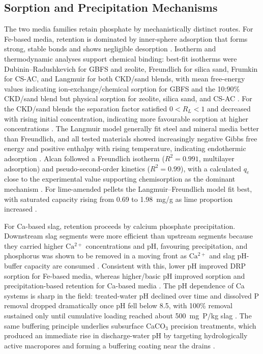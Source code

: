 \subsection{Sorption and Precipitation Mechanisms}

The two media families retain phosphate by mechanistically distinct routes.
For Fe-based media, retention is dominated by inner-sphere adsorption that forms
strong, stable bonds and shows negligible desorption \parencite{Mendes2022}.
Isotherm and thermodynamic analyses support chemical binding: best-fit isotherms
were Dubinin--Radushkevich for GBFS and zeolite, Freundlich for silica sand,
Frumkin for CS-AC, and Langmuir for both CKD/sand blends, with mean free-energy
values indicating ion-exchange/chemical sorption for GBFS and the 10:90\% CKD/sand
blend but physical sorption for zeolite, silica sand, and CS-AC
\parencite{Agrawal2011}. For the CKD/sand blends the separation factor satisfied
$0 < R_L < 1$ and decreased with rising initial concentration, indicating more
favourable sorption at higher concentrations \parencite{Agrawal2011}. The Langmuir
model generally fit steel and mineral media better than Freundlich, and all
tested materials showed increasingly negative Gibbs free energy and positive
enthalpy with rising temperature, indicating endothermic adsorption
\parencite{Sellner2019b}. Alcan followed a Freundlich isotherm ($R^2=0.991$,
multilayer adsorption) and pseudo-second-order kinetics ($R^2=0.99$), with a
calculated $q_e$ close to the experimental value supporting chemisorption as the
dominant mechanism \parencite{Kumari2025}. For lime-amended pellets the
Langmuir--Freundlich model fit best, with saturated capacity rising from 0.69 to
1.98~mg/g as lime proportion increased \parencite{Li2017}.

For Ca-based slag, retention proceeds by calcium phosphate precipitation.
Downstream slag segments were more efficient than upstream segments because they
carried higher $\mathrm{Ca^{2+}}$ concentrations and pH, favouring precipitation,
and phosphorus was shown to be removed in a moving front as $\mathrm{Ca^{2+}}$ and
slag pH-buffer capacity are consumed \parencite{Wang2020d}. Consistent with this,
lower pH improved DRP sorption for Fe-based media, whereas higher/basic pH
improved sorption and precipitation-based retention for Ca-based media
\parencite{Mendes2022}. The pH dependence of Ca systems is sharp in the field:
treated-water pH declined over time and dissolved P removal dropped dramatically
once pH fell below 8.5, with 100\% removal sustained only until cumulative loading
reached about 500~mg~P/kg slag \parencite{Penn2020}. The same buffering principle
underlies subsurface CaCO$_3$ precision treatments, which produced an immediate
rise in discharge-water pH by targeting hydrologically active macropores and
forming a buffering coating near the drains \parencite{Dalhem2019}.

